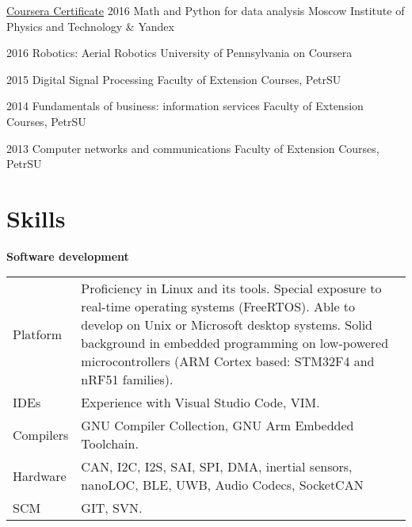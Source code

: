 \documentclass{tccv}
\begin{document}
\begin{eventlist}
\begin{yearlist}
\item[\href{https://www.coursera.org/account/accomplishments/records/PJCQYC92YUSU}{Coursera Certificate}]{2016}
     {Math and Python for data analysis}
     {Moscow Institute of Physics and Technology \& Yandex}

\item[]{2016}
     {Robotics: Aerial Robotics}
     {University of Pennsylvania on Coursera}

\item[]{2015}
     {Digital Signal Processing}
     {Faculty of Extension Courses, PetrSU}

\item[]{2014}
     {Fundamentals of business: information services}
     {Faculty of Extension Courses, PetrSU}

\end{yearlist}
\begin{yearlist}

\item[]{2013}
     {Computer networks and communications}
     {Faculty of Extension Courses, PetrSU}

\end{yearlist}

\section{Skills}

\renewcommand{\arraystretch}{1.5}

{\large{\textbf{Software development}}}
\vspace{-1em}
\begin{longtable}{ p{1.7cm} | p{15.5cm} }
  Platform & Proficiency in Linux and its tools. Special exposure to real-time operating systems (FreeRTOS). Able to develop on Unix or Microsoft desktop systems. Solid background in embedded programming on low-powered microcontrollers (ARM Cortex based: STM32F4 and nRF51 families). \\
  IDEs & Experience with Visual Studio Code, VIM.  \\
  Compilers & GNU Compiler Collection, GNU Arm Embedded Toolchain.  \\
  Hardware & CAN, I2C, I2S, SAI, SPI, DMA, inertial sensors, nanoLOC, BLE, UWB, Audio Codecs, SocketCAN\\
  SCM & GIT, SVN. \\
\end{longtable}



\end{eventlist}
\end{document}
